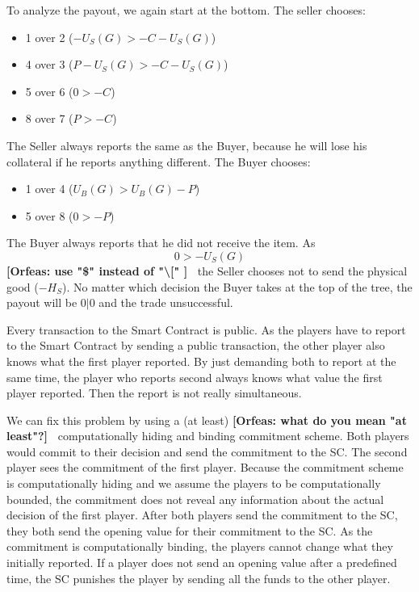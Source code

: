 \documentclass{cacthesis}
\newcommand{\authnote}[3]{{ \footnotesize \textbf{#1[#2: #3]~}}}
\newcommand{\orfnote}[1]{\authnote{\color{blue}}{Orfeas}{#1}}
\begin{document}
To analyze the payout, we again start at the bottom. The seller chooses:
\begin{itemize}
    \item 1 over 2 ($-U_S(G)>-C - U_S(G)$)
    \item 4 over 3 ($P-U_S(G)> -C-U_S(G)$)
    \item 5 over 6 ($0 > -C$)
    \item 8 over 7 ($P > -C$)
\end{itemize}
The Seller always reports the same as the Buyer, because he will lose his collateral if he reports anything different.\newline
The Buyer chooses:
\begin{itemize}
    \item 1 over 4 ($U_B(G)>U_B(G) - P$)
    \item 5 over 8 ($0>-P$)
\end{itemize}
The Buyer always reports that he did not receive the item.\newline
As \[0 > -U_S(G)\] \orfnote{use "\$" instead of "\textbackslash[" } the Seller
chooses not to send the physical good ($-H_S$).\newline
No matter which decision the Buyer takes at the top of the tree, the payout will be $0|0$ and the trade unsuccessful.


 Every transaction to the Smart Contract is public. As the players have to
 report to the Smart Contract by sending a public transaction, the other player
 also knows what the first player reported. By just demanding both to report at
 the same time, the player who reports second always knows what value the first player reported. Then the report is not really simultaneous.\newline

 We can fix this problem by using a (at least) \orfnote{what do you mean "at
 least"?} computationally hiding and binding commitment scheme. Both players would commit to their decision and send the commitment to the SC. The second player sees the commitment of the first player. Because the commitment scheme is computationally hiding and we assume the players to be computationally bounded, the commitment does not reveal any information about the actual decision of the first player. \newline
 After both players send the commitment to the SC, they both send the opening
 value for their commitment to the SC. As the commitment is computationally
 binding, the players cannot change what they initially reported. If a player
 does not send an opening value after a predefined time, the SC punishes the
 player by sending all the funds to the other player.
\end{document}
